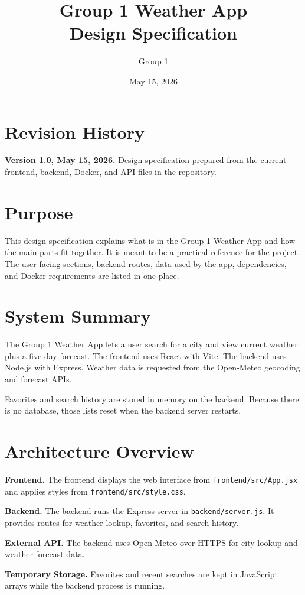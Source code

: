 \documentclass[11pt]{article}
\title{Group 1 Weather App\\Design Specification}
\author{Group 1}
\date{May 15, 2026}
\begin{document}
\maketitle

\section{Revision History}
\textbf{Version 1.0, May 15, 2026.} Design specification prepared from the current frontend, backend, Docker, and API files in the repository.

\section{Purpose}
This design specification explains what is in the Group 1 Weather App and how the main parts fit together. It is meant to be a practical reference for the project. The user-facing sections, backend routes, data used by the app, dependencies, and Docker requirements are listed in one place.

\section{System Summary}
The Group 1 Weather App lets a user search for a city and view current weather plus a five-day forecast. The frontend uses React with Vite. The backend uses Node.js with Express. Weather data is requested from the Open-Meteo geocoding and forecast APIs.

Favorites and search history are stored in memory on the backend. Because there is no database, those lists reset when the backend server restarts.

\section{Architecture Overview}
\textbf{Frontend.} The frontend displays the web interface from \texttt{frontend/src/App.jsx} and applies styles from \texttt{frontend/src/style.css}.

\textbf{Backend.} The backend runs the Express server in \texttt{backend/server.js}. It provides routes for weather lookup, favorites, and search history.

\textbf{External API.} The backend uses Open-Meteo over HTTPS for city lookup and weather forecast data.

\textbf{Temporary Storage.} Favorites and recent searches are kept in JavaScript arrays while the backend process is running.
\end{document}

